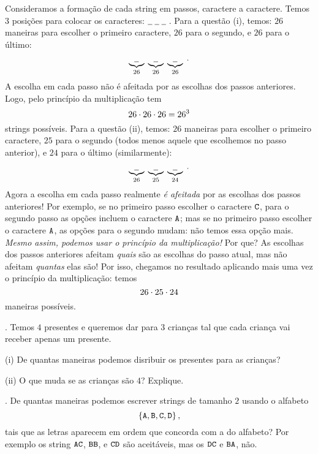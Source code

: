 \solution
Consideramos a formação de cada string em passos, caractere a caractere.
Temos 3 posições para colocar os caracteres:
$
\underline{\phantom{\txt Z}}
\;
\underline{\phantom{\txt Z}}
\;
\underline{\phantom{\txt Z}}
\;
$.
\endgraf
Para a questão (i), temos:
$26$ maneiras para escolher o primeiro caractere,
$26$ para o segundo, e
$26$ para o último:
$$
\underbrace{
\underline{\phantom{\txt Z}}
}_{26}
\;
\underbrace{
\underline{\phantom{\txt Z}}
}_{26}
\;
\underbrace{
\underline{\phantom{\txt Z}}
}_{26}
\;.
$$
A escolha em cada passo não é afeitada por as escolhas dos passos anteriores.
Logo, pelo princípio da multiplicação tem
$$
26\mathbin{\cdot} 26\mathbin{\cdot} 26 = 26^3
$$
strings possíveis.
\endgraf
Para a questão (ii), temos:
$26$ maneiras para escolher o primeiro caractere,
$25$ para o segundo (todos menos aquele que escolhemos no passo anterior), e
$24$ para o último (similarmente):
$$
\underbrace{
\underline{\phantom{\txt Z}}
}_{26}
\;
\underbrace{
\underline{\phantom{\txt Z}}
}_{25}
\;
\underbrace{
\underline{\phantom{\txt Z}}
}_{24}
\;.
$$
Agora a escolha em cada passo realmente \emph{é afeitada} por as escolhas
dos passos anteriores!
Por exemplo, se no primeiro passo escolher o caractere $\text{\tt C}$, para
o segundo passo as opções incluem o caractere $\text{\tt A}$; 
mas se no primeiro passo escolher o caractere $\text{\tt A}$, as opções para o segundo
mudam: não temos essa opção mais.
\emph{Mesmo assim, podemos usar o princípio da multiplicação!}
Por que?
As escolhas dos passos anteriores afeitam \emph{quais} são as escolhas do passo atual,
mas não afeitam \emph{quantas} elas são!
Por isso, chegamos no resultado aplicando mais uma vez o princípio da multiplicação:
temos
$$
26\mathbin{\cdot} 25\mathbin{\cdot} 24
$$
maneiras possíveis.

\endexample

\exercise.
Temos $4$ presentes e queremos dar para $3$ crianças tal que cada criança vai
receber apenas um presente.
\item{(i)} De quantas maneiras podemos disribuir os presentes para as crianças?
\item{(ii)} O que muda se as crianças são $4$?  Explique.

\endexercise

\exercise.
De quantas maneiras podemos escrever strings de tamanho $2$ usando o alfabeto
$$
\left\{\text{\tt A}, \text{\tt B}, \text{\tt C}, \text{\tt D}\right\},
$$
tais que as letras aparecem em ordem que concorda com a do alfabeto?
Por exemplo os string $\text{\tt A} \text{\tt C}$, $\text{\tt B} \text{\tt B}$, e $\text{\tt C} \text{\tt D}$ são aceitáveis,
mas os $\text{\tt D} \text{\tt C}$ e $\text{\tt B} \text{\tt A}$, não.

